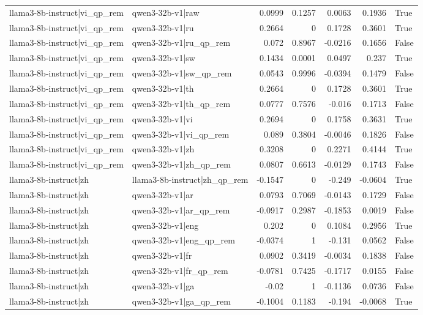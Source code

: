 \begin{table}
\begin{tabular}{l l r r r r l}
llama3-8b-instruct|vi_qp_rem & qwen3-32b-v1|raw & 0.0999 & 0.1257 & 0.0063 & 0.1936 & True \\
llama3-8b-instruct|vi_qp_rem & qwen3-32b-v1|ru & 0.2664 & 0 & 0.1728 & 0.3601 & True \\
llama3-8b-instruct|vi_qp_rem & qwen3-32b-v1|ru_qp_rem & 0.072 & 0.8967 & -0.0216 & 0.1656 & False \\
llama3-8b-instruct|vi_qp_rem & qwen3-32b-v1|sw & 0.1434 & 0.0001 & 0.0497 & 0.237 & True \\
llama3-8b-instruct|vi_qp_rem & qwen3-32b-v1|sw_qp_rem & 0.0543 & 0.9996 & -0.0394 & 0.1479 & False \\
llama3-8b-instruct|vi_qp_rem & qwen3-32b-v1|th & 0.2664 & 0 & 0.1728 & 0.3601 & True \\
llama3-8b-instruct|vi_qp_rem & qwen3-32b-v1|th_qp_rem & 0.0777 & 0.7576 & -0.016 & 0.1713 & False \\
llama3-8b-instruct|vi_qp_rem & qwen3-32b-v1|vi & 0.2694 & 0 & 0.1758 & 0.3631 & True \\
llama3-8b-instruct|vi_qp_rem & qwen3-32b-v1|vi_qp_rem & 0.089 & 0.3804 & -0.0046 & 0.1826 & False \\
llama3-8b-instruct|vi_qp_rem & qwen3-32b-v1|zh & 0.3208 & 0 & 0.2271 & 0.4144 & True \\
llama3-8b-instruct|vi_qp_rem & qwen3-32b-v1|zh_qp_rem & 0.0807 & 0.6613 & -0.0129 & 0.1743 & False \\
llama3-8b-instruct|zh & llama3-8b-instruct|zh_qp_rem & -0.1547 & 0 & -0.249 & -0.0604 & True \\
llama3-8b-instruct|zh & qwen3-32b-v1|ar & 0.0793 & 0.7069 & -0.0143 & 0.1729 & False \\
llama3-8b-instruct|zh & qwen3-32b-v1|ar_qp_rem & -0.0917 & 0.2987 & -0.1853 & 0.0019 & False \\
llama3-8b-instruct|zh & qwen3-32b-v1|eng & 0.202 & 0 & 0.1084 & 0.2956 & True \\
llama3-8b-instruct|zh & qwen3-32b-v1|eng_qp_rem & -0.0374 & 1 & -0.131 & 0.0562 & False \\
llama3-8b-instruct|zh & qwen3-32b-v1|fr & 0.0902 & 0.3419 & -0.0034 & 0.1838 & False \\
llama3-8b-instruct|zh & qwen3-32b-v1|fr_qp_rem & -0.0781 & 0.7425 & -0.1717 & 0.0155 & False \\
llama3-8b-instruct|zh & qwen3-32b-v1|ga & -0.02 & 1 & -0.1136 & 0.0736 & False \\
llama3-8b-instruct|zh & qwen3-32b-v1|ga_qp_rem & -0.1004 & 0.1183 & -0.194 & -0.0068 & True \\

\end{tabular}
\end{table}
